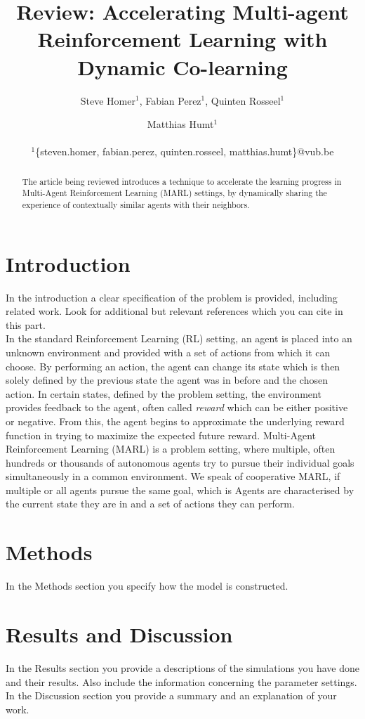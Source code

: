 \documentclass[letterpaper]{article}
\title{Review: Accelerating Multi-agent Reinforcement Learning
with Dynamic Co-learning}
\author{Steve Homer$^1$, Fabian Perez$^1$, Quinten Rosseel$^1$ \and Matthias Humt$^1$ \\
\mbox{}\\
$^1$\{steven.homer, fabian.perez, quinten.rosseel, matthias.humt\}@vub.be}
\begin{document}
\maketitle

\begin{abstract}
 The article being reviewed introduces a technique to accelerate the learning progress in Multi-Agent Reinforcement Learning (MARL) settings, by dynamically sharing the experience of contextually similar agents with their neighbors.
\end{abstract}

\section{Introduction}
In the introduction a clear specification of the problem is provided, including related work. Look for additional but relevant references which you can cite in this part.\\[.5cm]

In the standard Reinforcement Learning (RL) setting, an agent is placed into an unknown environment and provided with a set of actions from which it can choose. By performing an action, the agent can change its state which is then solely defined by the previous state the agent was in before and the chosen action. In certain states, defined by the problem setting, the environment provides feedback to the agent, often called \textit{reward} which can be either positive or negative. From this, the agent begins to approximate the underlying reward function in trying to maximize the expected future reward.  Multi-Agent Reinforcement Learning (MARL) is a problem setting, where multiple, often hundreds or thousands of autonomous agents try to pursue their individual goals simultaneously in a common environment. We speak of cooperative MARL, if multiple or all agents pursue the same goal, which is
Agents are characterised by the current state they are in and a set of actions they can perform.

\section{Methods}
In the Methods section you specify how the model is constructed.\\[.5cm]
\blindtext

\section{Results and Discussion}
In the Results section you provide a descriptions of the simulations you have done and their results.  Also include the information concerning the parameter settings.\\
In the Discussion section you provide a summary and an explanation of your work.\\[.5cm]
\blindtext
\end{document}
